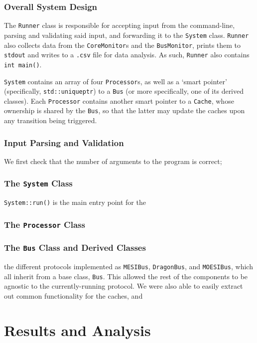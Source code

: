 \documentclass[date,tikzlibs,lmodern,10pt]{epreport}
\begin{document}
\subsubsection{Overall System Design}
The \texttt{Runner} class is responsible for accepting input from the command-line, parsing and validating said input, and forwarding it to the \texttt{System} class.
\texttt{Runner} also collects data from the \texttt{CoreMonitor}s and the \texttt{BusMonitor}, prints them to \texttt{stdout} and writes to a \texttt{.csv} file for data analysis.
As such, \texttt{Runner} also contains \texttt{int main()}.

\texttt{System} contains an array of four \texttt{Processor}s, as well as a `smart pointer' (specifically, \texttt{std::unique\textunderscore{}ptr}) to a \texttt{Bus} (or more specifically, one of its derived classes).
Each \texttt{Processor} contains another smart pointer to a \texttt{Cache}, whose ownership is shared by the \texttt{Bus}, so that the latter may update the caches upon any transition being triggered.

\subsubsection{Input Parsing and Validation}
We first check that the number of arguments to the program is correct;

\subsubsection{The \texttt{System} Class}
\texttt{System::run()} is the main entry point for the

\subsubsection{The \texttt{Processor} Class}
\subsubsection{The \texttt{Bus} Class and Derived Classes}
the different protocols implemented as \texttt{MESIBus}, \texttt{DragonBus}, and \texttt{MOESIBus}, which all inherit from a base class, \texttt{Bus}.
This allowed the rest of the components to be agnostic to the currently-running protocol.
We were also able to easily extract out common functionality for the caches, and
\section{Results and Analysis}
\end{document}
